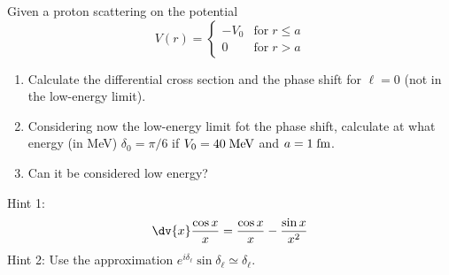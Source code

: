 \begin{esercizio}
   Given a proton scattering on the potential
   \begin{equation*}
      V(r)=
      \begin{cases}
         -V_0 & \text{for} \; r \leq a\\
         0 & \text{for} \; r > a
      \end{cases}
   \end{equation*}
   \begin{enumerate}[label=\alph*), leftmargin=0.6cm]
      \item Calculate the differential cross section and the phase shift for $\ell=0$ (not in the low-energy limit).
      \item Considering now the low-energy limit fot the phase shift, calculate at what energy (in MeV) $\delta_0=\pi/6$ if $V_0=40 \rm \; MeV$ and $a=1 \rm \; fm$.
      \item Can it be considered low energy?
   \end{enumerate}
   Hint 1:
   \begin{equation*}
      \dv{x} \frac{\cos{x}}{x}
      =\frac{\cos{x}}{x} - \frac{\sin{x}}{x^2}
   \end{equation*}
   Hint 2: Use the approximation $e^{i \delta_{\ell}} \sin{\delta_{\ell}} \simeq \delta_{\ell}$.
\end{esercizio}
